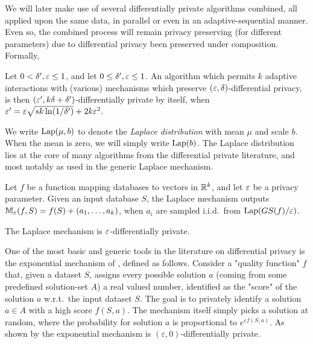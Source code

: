 \documentclass[12pt,a4paper,oneside,onecolumn]{book}
\begin{document}
We will later make use of several differentially private algorithms combined, all applied upon the same data, in parallel or even in an adaptive-sequential manner.
Even so, the combined process will remain privacy preserving (for different parameters) due to differential privacy been preserved under composition. Formally,
\begin{theorem}
Let $0<\delta', \varepsilon\leq1$,
and let $0\leq\delta', \varepsilon\leq1$.
An algorithm which permits $k$ adaptive interactions with (various) mechanisms which preserve $(\varepsilon, \delta)$-differential privacy, 
is then 
$(\varepsilon', k\delta+\delta')$-differentially private by itself, 
when
$\varepsilon' = 
\varepsilon\sqrt{sk\ln(1/\delta')} + 2k\varepsilon^2.
$
\end{theorem}

We write $\mathrm{Lap}(\mu,b)$ to denote the \emph{Laplace distribution} 
with mean $\mu$ and scale $b$. When the mean is zero, we will simply write $\mathrm{Lap}(b)$. The Laplace distribution lies at the core of many algorithms from the differential private literature, and most notably as used in the generic Laplace mechanism.
\begin{definition}
Let $f$ be a function mapping databases to vectors in $\mathbb{R}^k$, and let $\varepsilon$ be a privacy parameter.
Given an input database $S$, the Laplace mechanism outputs 
$\mathbb{M}_\varepsilon(f,S) = f(S) + (a_1,\ldots,a_k)$,
when $a_i$ are sampled i.i.d.\ from $\mathrm{Lap}(GS(f)/\varepsilon)$.
\end{definition}

\begin{theorem}
\label{thm:lap}
The Laplace mechanism is $\varepsilon$-differentially private.
\end{theorem}

One of the most basic and generic tools in the literature on differential privacy is the exponential mechanism of \citet{mcsherry2007mechanism}, defined as follows. Consider a "quality function" $f$ that, given a dataset $S$, assigns every possible solution $a$ (coming from some predefined solution-set $A$) a real valued number, identified as the "score" of the solution $a$ w.r.t.\ the input dataset $S$. The goal is to privately identify a solution $a\in A$ with a high score $f(S,a)$. The mechanism itself simply picks a solution at random, where the probability for solution $a$ is proportional to $e^{\varepsilon f(S,a)}$. As shown by \citet{mcsherry2007mechanism} the exponential mechanism is $(\varepsilon,0)$-differentially private.
\end{document}
